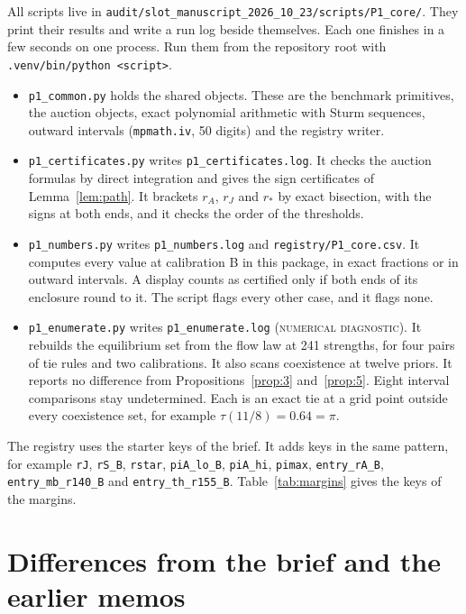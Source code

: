 \documentclass[11pt]{article}
\theoremstyle{definition}
\newcommand{\lab}[1]{\textsc{#1}}
\begin{document}
All scripts live in \texttt{audit/slot\_manuscript\_2026\_10\_23/scripts/P1\_core/}. They print their results and
write a run log beside themselves. Each one finishes in a few seconds on one process. Run them from the
repository root with \texttt{.venv/bin/python <script>}.
\begin{itemize}
\item \texttt{p1\_common.py} holds the shared objects. These are the benchmark primitives, the auction objects,
  exact polynomial arithmetic with Sturm sequences, outward intervals (\texttt{mpmath.iv}, 50 digits) and the
  registry writer.
\item \texttt{p1\_certificates.py} writes \texttt{p1\_certificates.log}. It checks the auction formulas by direct
  integration and gives the sign certificates of Lemma~\ref{lem:path}. It brackets $r_A$, $r_J$ and $r_*$ by
  exact bisection, with the signs at both ends, and it checks the order of the thresholds.
\item \texttt{p1\_numbers.py} writes \texttt{p1\_numbers.log} and \texttt{registry/P1\_core.csv}. It computes every
  value at calibration B in this package, in exact fractions or in outward intervals. A display counts as
  certified only if both ends of its enclosure round to it. The script flags every other case, and it flags none.
\item \texttt{p1\_enumerate.py} writes \texttt{p1\_enumerate.log} (\lab{numerical diagnostic}). It rebuilds the
  equilibrium set from the flow law at 241 strengths, for four pairs of tie rules and two calibrations. It also
  scans coexistence at twelve priors. It reports no difference from Propositions~\ref{prop:3} and~\ref{prop:5}.
  Eight interval comparisons stay undetermined. Each is an exact tie at a grid point outside every coexistence
  set, for example $\tau(11/8)=0.64=\pi$.
\end{itemize}
The registry uses the starter keys of the brief. It adds keys in the same pattern, for example \texttt{rJ},
\texttt{rS\_B}, \texttt{rstar}, \texttt{piA\_lo\_B}, \texttt{piA\_hi}, \texttt{pimax}, \texttt{entry\_rA\_B},
\texttt{entry\_mb\_r140\_B} and \texttt{entry\_th\_r155\_B}. Table~\ref{tab:margins} gives the keys of the margins.

\section{Differences from the brief and the earlier memos}\label{sec:differences}
\end{document}
